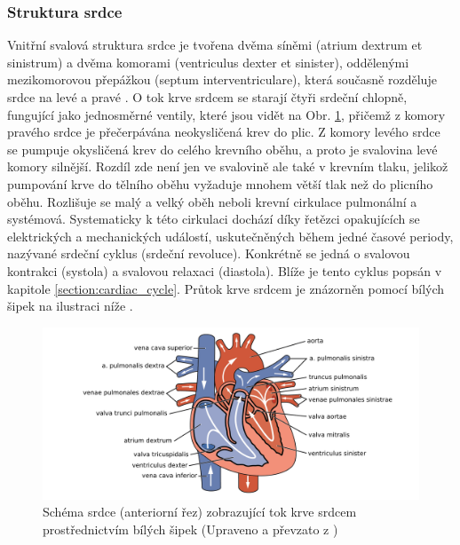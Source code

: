 \subsubsection{Struktura srdce}
\label{section:heart_structure}
Vnitřní svalová struktura srdce je tvořena dvěma síněmi (atrium dextrum et
sinistrum) a dvěma komorami (ventriculus dexter et sinister), oddělenými
mezikomorovou přepážkou (septum interventriculare), která současně rozděluje
srdce na levé a pravé \cite{Memorix2017}. O tok krve srdcem se starají čtyři
srdeční chlopně, fungující jako jednosměrné ventily, které jsou vidět na Obr.
\ref{fig:heartanatomy}, přičemž z komory pravého srdce je přečerpávána
neokysličená krev do plic. Z komory levého srdce se pumpuje okysličená krev do
celého krevního oběhu, a proto je svalovina levé komory silnější. Rozdíl zde
není jen ve svalovině ale také v krevním tlaku, jelikož pumpování krve do
tělního oběhu vyžaduje mnohem větší tlak než do plicního oběhu. Rozlišuje se
malý a velký oběh neboli krevní cirkulace pulmonální a systémová. Systematicky k
této cirkulaci dochází díky řetězci opakujících se elektrických a mechanických
událostí, uskutečněných během jedné časové periody, nazývané srdeční cyklus
(srdeční revoluce). Konkrétně se jedná o svalovou kontrakci (systola) a svalovou
relaxaci (diastola). Blíže je tento cyklus popsán v kapitole
\ref{section:cardiac_cycle}. Průtok krve srdcem je znázorněn pomocí bílých šipek
na ilustraci níže \cite{Stejfa2006}.

\begin{figure}[h]
	\begin{center}
		\includegraphics[width=1\textwidth]{../assets/anatomy/heart}
		\caption{Schéma srdce (anteriorní řez) zobrazující tok krve srdcem
			prostřednictvím bílých šipek (Upraveno a převzato z
			\cite{OpenStax})}
		\label{fig:heartanatomy}
	\end{center}
\end{figure}

